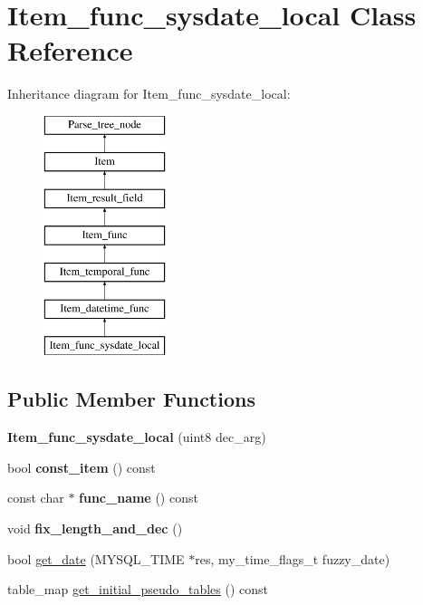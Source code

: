 \hypertarget{classItem__func__sysdate__local}{}\section{Item\+\_\+func\+\_\+sysdate\+\_\+local Class Reference}
\label{classItem__func__sysdate__local}
Inheritance diagram for Item\+\_\+func\+\_\+sysdate\+\_\+local\+:\begin{figure}[H]
\begin{center}
\leavevmode
\includegraphics[height=7.000000cm]{classItem__func__sysdate__local}
\end{center}
\end{figure}
\subsection*{Public Member Functions}
\begin{DoxyCompactItemize}
\item 
\mbox{\label{classItem__func__sysdate__local_a4990e1b3eaa2fd48557dc57e7497e022}} 
{\bfseries Item\+\_\+func\+\_\+sysdate\+\_\+local} (uint8 dec\+\_\+arg)
\item 
\mbox{\label{classItem__func__sysdate__local_a26412373ed0f5e2f9ed47ed030a74c23}} 
bool {\bfseries const\+\_\+item} () const
\item 
\mbox{\label{classItem__func__sysdate__local_a6f0696535b7f79b6a040470054187c89}} 
const char $\ast$ {\bfseries func\+\_\+name} () const
\item 
\mbox{\label{classItem__func__sysdate__local_ae76a6981d0d68c6cbb3cbcebb519c66a}} 
void {\bfseries fix\+\_\+length\+\_\+and\+\_\+dec} ()
\item 
bool \mbox{\hyperlink{classItem__func__sysdate__local_a255101d1f8859223b3467024d66d6f0a}{get\+\_\+date}} (M\+Y\+S\+Q\+L\+\_\+\+T\+I\+ME $\ast$res, my\+\_\+time\+\_\+flags\+\_\+t fuzzy\+\_\+date)
\item 
table\+\_\+map \mbox{\hyperlink{classItem__func__sysdate__local_a89c15806cffaf36b3b37d19e97a829e3}{get\+\_\+initial\+\_\+pseudo\+\_\+tables}} () const
\end{DoxyCompactItemize}
